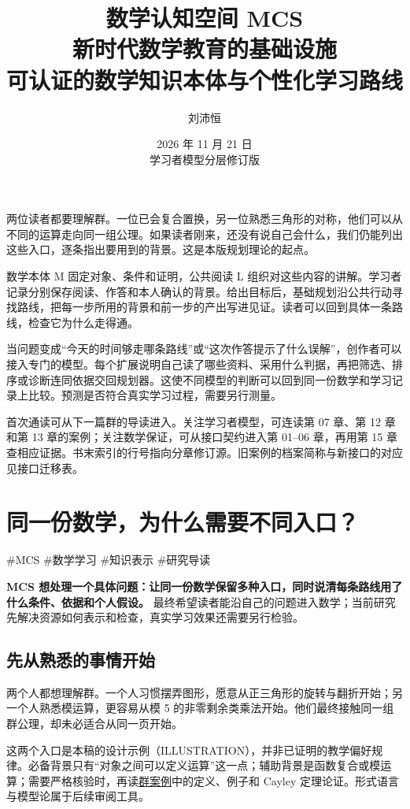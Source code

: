 \documentclass[UTF8,a4paper,zihao=-4,fontset=windows,openany]{ctexbook}
\title{\Huge 数学认知空间 MCS\\[0.7em]\Large 新时代数学教育的基础设施\\[0.45em]\large 可认证的数学知识本体与个性化学习路线}
\author{刘沛恒}
\date{2026 年 11 月 21 日\\[0.3em]学习者模型分层修订版}
\newcommand{\mcsorigin}[1]{\par\noindent{\small\color{black!55}#1}\par\addvspace{0.8em}}
\begin{document}
\maketitle
\thispagestyle{empty}
\par\bigskip
两位读者都要理解群。一位已会复合置换，另一位熟悉三角形的对称，他们可以从不同的运算走向同一组公理。如果读者刚来，还没有说自己会什么，我们仍能列出这些入口，逐条指出要用到的背景。这是本版规划理论的起点。

数学本体 M 固定对象、条件和证明，公共阅读 L 组织对这些内容的讲解。学习者记录分别保存阅读、作答和本人确认的背景。给出目标后，基础规划沿公共行动寻找路线，把每一步所用的背景和前一步的产出写进见证。读者可以回到具体一条路线，检查它为什么走得通。

当问题变成“今天的时间够走哪条路线”或“这次作答提示了什么误解”，创作者可以接入专门的模型。每个扩展说明自己读了哪些资料、采用什么判据，再把筛选、排序或诊断连同依据交回规划器。这使不同模型的判断可以回到同一份数学和学习记录上比较。预测是否符合真实学习过程，需要另行测量。

首次通读可从下一篇群的导读进入。关注学习者模型，可连读第 07 章、第 12 章和第 13 章的案例；关注数学保证，可从接口契约进入第 01–06 章，再用第 15 章查相应证据。书末索引的行号指向分章修订源。旧案例的档案简称与新接口的对应见接口迁移表。

\tableofcontents
\clearpage
\clearpage\chapter{同一份数学，为什么需要不同入口？}
\label{mcs-source-1}
\mcsorigin{原章节：导读.md}
\#MCS \#数学学习 \#知识表示 \#研究导读

\textbf{MCS 想处理一个具体问题：让同一份数学保留多种入口，同时说清每条路线用了什么条件、依据和个人假设。} 最终希望读者能沿自己的问题进入数学；当前研究先解决资源如何表示和检查，真实学习效果还需要另行检验。

\section{先从熟悉的事情开始}
两个人都想理解群。一个人习惯摆弄图形，愿意从正三角形的旋转与翻折开始；另一个人熟悉模运算，更容易从模 5 的非零剩余类乘法开始。他们最终接触同一组群公理，却未必适合从同一页开始。

这两个入口是本稿的设计示例（ILLUSTRATION），并非已证明的教学偏好规律。必备背景只有“对象之间可以定义运算”这一点；辅助背景是函数复合或模运算；需要严格核验时，再读\hyperref[mcs-source-19]{群案例}中的定义、例子和 Cayley 定理论证。形式语言与模型论属于后续审阅工具。
\end{document}
